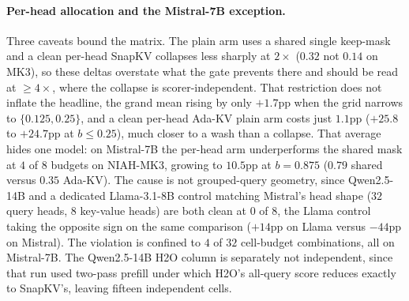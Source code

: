 \paragraph{Per-head allocation and the Mistral-7B exception.}
Three caveats bound the matrix. The plain arm uses a shared single keep-mask
and a clean per-head SnapKV collapses less sharply at $2\times$ ($0.32$ not
$0.14$ on MK3), so these deltas overstate what the gate prevents there and
should be read at $\ge 4\times$, where the collapse is scorer-independent.
That restriction does not inflate the headline, the grand mean rising by only
$+1.7$pp when the grid narrows to $\{0.125, 0.25\}$,
and a clean per-head Ada-KV plain arm costs just $1.1$pp ($+25.8$ to $+24.7$pp
at $b \le 0.25$), much closer to a wash than a collapse. That average hides
one model: on Mistral-7B the per-head arm underperforms the shared mask at $4$
of $8$ budgets on NIAH-MK3, growing to $10.5$pp at $b = 0.875$ ($0.79$ shared
versus $0.35$ Ada-KV). The cause is not grouped-query geometry, since
Qwen2.5-14B and a dedicated Llama-3.1-8B control matching Mistral's head shape
($32$ query heads, $8$ key-value heads) are both clean at $0$ of $8$, the
Llama control taking the opposite sign on the same comparison ($+14$pp on
Llama versus $-44$pp on Mistral). The violation is confined to $4$ of $32$
cell-budget combinations, all on Mistral-7B. The Qwen2.5-14B H2O column is
separately not independent, since that run used two-pass prefill under which
H2O's all-query score reduces exactly to SnapKV's, leaving fifteen independent
cells.


